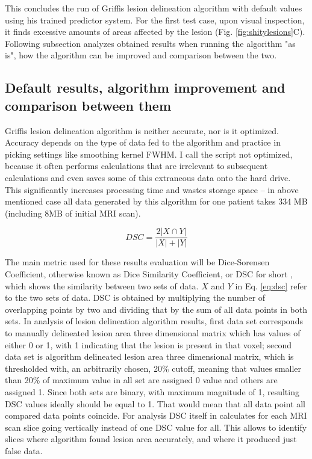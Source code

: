 \documentclass[12pt]{article}
\begin{document}
This concludes the run of Griffis lesion delineation algorithm with default values using his trained predictor system. For the first test case, upon visual inspection, it finds excessive amounts of areas affected by the lesion (Fig. \ref{fig:shitylesions}C). Following subsection analyzes obtained results when running the algorithm "as is", how the algorithm can be improved and comparison between the two.

\subsection{Default results, algorithm improvement and comparison between them}
\label{ssec:griffisResults}

Griffis lesion delineation algorithm is neither accurate, nor is it optimized. Accuracy depends on the type of data fed to the algorithm and practice in picking settings like smoothing kernel FWHM. I call the script not optimized, because it often performs calculations that are irrelevant to subsequent calculations and even saves some of this extraneous data onto the hard drive. This significantly increases processing time and wastes storage space – in above mentioned case all data generated by this algorithm for one patient takes 334 MB (including 8MB of initial MRI scan).

\begin{equation}
\label{eq:dsc}
DSC=\frac{2|X\cap Y|}{|X|+|Y|}
\end{equation}

The main metric used for these results evaluation will be Dice-Sorensen Coefficient, otherwise known as Dice Similarity Coefficient, or DSC for short \cite{dice1945measures}, which shows the similarity between two sets of data. $X$ and $Y$ in Eq. \ref{eq:dsc} refer to the two sets of data. DSC is obtained by multiplying the number of overlapping points by two and dividing that by the sum of all data points in both sets. In analysis of lesion delineation algorithm results, first data set corresponds to manually delineated lesion area three dimensional matrix which has values of either 0 or 1, with 1 indicating that the lesion is present in that voxel; second data set is algorithm delineated lesion area three dimensional matrix, which is thresholded with, an arbitrarily chosen, 20\% cutoff, meaning that values smaller than 20\% of maximum value in all set are assigned 0 value and others are assigned 1. Since both sets are binary, with maximum magnitude of 1, resulting DSC values ideally should be equal to 1. That would mean that all data point all compared data points coincide. For analysis DSC itself in calculates for each MRI scan slice going vertically instead of one DSC value for all. This allows to identify slices where algorithm found lesion area accurately, and where it produced just false data.
\end{document}
